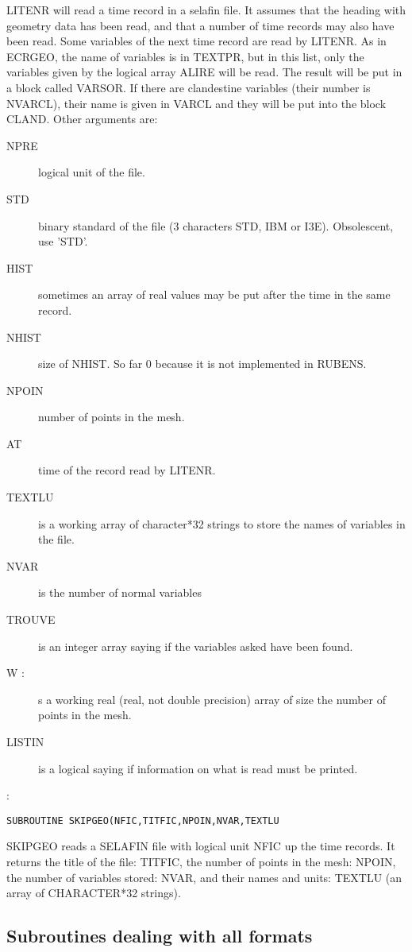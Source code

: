 LITENR will read a time record in a selafin file. It assumes that the heading
with geometry data has been read, and that a number of time records may also
have been read. Some variables of the next time record are read by LITENR. As
in ECRGEO, the name of variables is in TEXTPR, but in this list, only the
variables given by the logical array ALIRE will be read. The result will be put
in a block called VARSOR. If there are clandestine variables (their number is
NVARCL), their name is given in VARCL and they will be put into the block
CLAND. Other arguments are:
\begin{description}
  \item [NPRE] logical unit of the file.
  \item [STD] binary standard of the file (3 characters STD, IBM or I3E).
    Obsolescent, use 'STD'.
  \item [HIST] sometimes an array of real values may be put after the time in
    the same record.
  \item [NHIST] size of NHIST. So far 0 because it is not implemented in
    RUBENS.
  \item [NPOIN] number of points in the mesh.
  \item [AT] time of the record read by LITENR.
  \item [TEXTLU] is a working array of character*32 strings to store the names
    of variables in the file.
  \item [NVAR] is the number of normal variables
  \item [TROUVE] is an integer array saying if the variables asked have been
    found.
  \item [W :]s a working real (real, not double precision) array of size the
    number of points in the mesh.
  \item [LISTIN] is a logical saying if information on what is read must be
    printed.
\end{description}

:
\begin{lstlisting}[language=TelFortran]
SUBROUTINE SKIPGEO(NFIC,TITFIC,NPOIN,NVAR,TEXTLU
\end{lstlisting}

SKIPGEO reads a SELAFIN file with logical unit NFIC up the time records. It
returns the title of the file: TITFIC, the number of points in the mesh: NPOIN,
the number of variables stored: NVAR, and their names and units: TEXTLU (an
array of CHARACTER*32 strings).

\subsection{Subroutines dealing with all formats}


